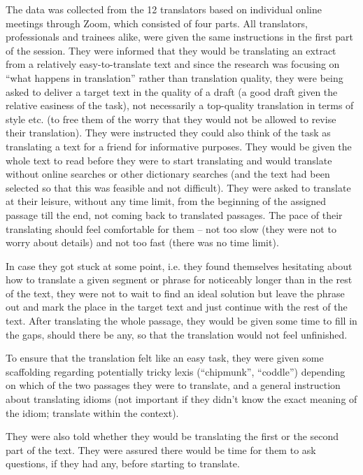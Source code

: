 \documentclass[output=paper]{langscibook}
\begin{document}
The data was collected from the 12 translators based on individual online meetings through Zoom, which consisted of four parts. All translators, professionals and trainees alike, were given the same instructions in the first part of the session. They were informed that they would be translating an extract from a relatively easy-to-translate text and since the research was focusing on “what happens in translation” rather than translation quality, they were being asked to deliver a target text in the quality of a draft (a good draft given the relative easiness of the task), not necessarily a top-quality translation in terms of style etc. (to free them of the worry that they would not be allowed to revise their translation). They were instructed they could also think of the task as translating a text for a friend for informative purposes. They would be given the whole text to read before they were to start translating and would translate without online searches or other dictionary searches (and the text had been selected so that this was feasible and not difficult). They were asked to translate at their leisure, without any time limit, from the beginning of the assigned passage till the end, not coming back to translated passages. The pace of their translating should feel comfortable for them – not too slow (they were not to worry about details) and not too fast (there was no time limit).

In case they got stuck at some point, i.e. they found themselves hesitating about how to translate a given segment or phrase for noticeably longer than in the rest of the text, they were not to wait to find an ideal solution but leave the phrase out and mark the place in the target text and just continue with the rest of the text. After translating the whole passage, they would be given some time to fill in the gaps, should there be any, so that the translation would not feel unfinished.

To ensure that the translation felt like an easy task, they were given some scaffolding regarding potentially tricky lexis (“chipmunk”, “coddle”) depending on which of the two passages they were to translate, and a general instruction about translating idioms (not important if they didn’t know the exact meaning of the idiom; translate within the context).

They were also told whether they would be translating the first or the second part of the text. They were assured there would be time for them to ask questions, if they had any, before starting to translate.
\end{document}
